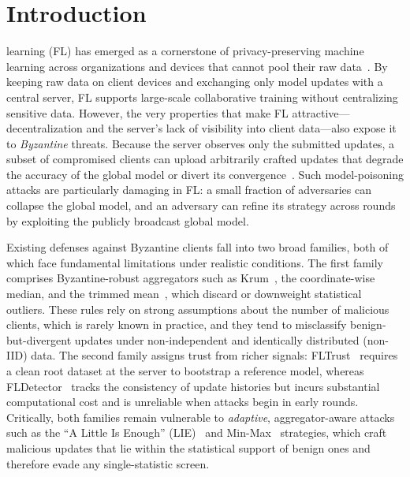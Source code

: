 \documentclass[journal]{IEEEtran}
\begin{document}
\section{Introduction}
\label{sec:introduction}


 learning (FL) has emerged as a cornerstone of privacy-preserving machine learning across organizations and devices that cannot pool their raw data~\cite{sandeepa2025federated}. By keeping raw data on client devices and exchanging only model updates with a central server, FL supports large-scale collaborative training without centralizing sensitive data. However, the very properties that make FL attractive---decentralization and the server's lack of visibility into client data---also expose it to \emph{Byzantine} threats. Because the server observes only the submitted updates, a subset of compromised clients can upload arbitrarily crafted updates that degrade the accuracy of the global model or divert its convergence~\cite{baruch2019little, fang2020local, shejwalkar2021manipulating}. Such model-poisoning attacks are particularly damaging in FL: a small fraction of adversaries can collapse the global model, and an adversary can refine its strategy across rounds by exploiting the publicly broadcast global model.

Existing defenses against Byzantine clients fall into two broad families, both of which face fundamental limitations under realistic conditions. The first family comprises Byzantine-robust aggregators such as Krum~\cite{blanchard2017machine}, the coordinate-wise median, and the trimmed mean~\cite{yin2018byzantine}, which discard or downweight statistical outliers. These rules rely on strong assumptions about the number of malicious clients, which is rarely known in practice, and they tend to misclassify benign-but-divergent updates under non-independent and identically distributed (non-IID) data. The second family assigns trust from richer signals: FLTrust~\cite{cao2020fltrust} requires a clean root dataset at the server to bootstrap a reference model, whereas FLDetector~\cite{zhang2022fldetector} tracks the consistency of update histories but incurs substantial computational cost and is unreliable when attacks begin in early rounds. Critically, both families remain vulnerable to \emph{adaptive}, aggregator-aware attacks such as the ``A Little Is Enough'' (LIE)~\cite{baruch2019little} and Min-Max~\cite{shejwalkar2021manipulating} strategies, which craft malicious updates that lie within the statistical support of benign ones and therefore evade any single-statistic screen.
\end{document}
